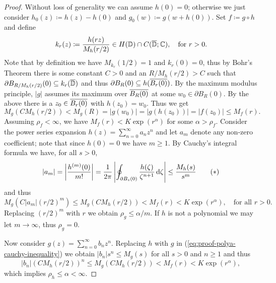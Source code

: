 \begin{proof}
    Without loss of generality we can assume $h(0) = 0$; otherwise we just consider $h_0(z) \coloneqq h(z) - h(0)$ and $g_0(w) \coloneqq g(w + h(0))$. Set $f \coloneqq g \circ h$ and define
    \begin{equation*}
        k_r(z) \coloneqq \frac{h(rz)}{M_h(r / 2)} \in H(\mathbb{D}) \cap C(\overline{\mathbb{D}}; \mathbb{C}), \quad \textrm{for } r > 0.
    \end{equation*}
    Note that by definition we have $M_{k_r}(1/2) = 1$ and $k_r(0) = 0$, thus by Bohr's Theorem there is some constant $C > 0$ and an $R / M_h(r/2) > C$ such that $\partial B_{R / M_h(r/2)}(0) \subseteq k_r(\overline{\mathbb{D}})$ and thus $\partial B_R(0) \subseteq h(\overline{B_r(0)})$. By the maximum modulus principle, $\vert g \vert$ assumes its maximum over $\overline{B_R(0)}$ at some $w_0 \in \partial B_R(0)$. By the above there is a $z_0 \in \overline{B_r(0)}$ with $h(z_0) = w_0$. Thus we get
    \begin{equation*}
        M_g(C M_h(r / 2)) < M_g(R) = \vert g(w_0) \vert = \vert g(h(z_0)) \vert = \vert f(z_0) \vert \leq M_f(r).
    \end{equation*}
    Assuming $\rho_f < \infty$, we have $M_f(r) < K \exp(r^\alpha)$ for some $\alpha > \rho_f$. Consider the power series expansion $h(z) = \sum_{n=0}^\infty a_n z^n$ and let $a_m$ denote any non-zero coefficient; note that since $h(0) = 0$ we have $m \geq 1$. By Cauchy's integral formula we have, for all $s > 0$,
    \begin{equation*} \label{eq:proof-polya-cauchy-inequality}
        \vert a_m \vert = \left\vert \frac{h^{(m)}(0)}{m!} \right\vert = \frac{1}{2\pi} \left\vert \oint_{\partial B_{s}(0)} \frac{h(\zeta)}{\zeta^{n+1}} \mathop{}\!\mathrm{d} \zeta \right\vert \leq \frac{M_h(s)}{s^m} \tag{\textasteriskcentered}
    \end{equation*}
    and thus
    \begin{equation*}
        M_g(C \vert a_m \vert (r/2)^m) \leq M_g(C M_h(r/2)) < M_f(r) < K \exp(r^\alpha), \quad \textrm{for all } r > 0.
    \end{equation*}
    Replacing $(r/2)^m$ with $r$ we obtain $\rho_g \leq \alpha / m $. If $h$ is not a polynomial we may let $m \to \infty$, thus $\rho_g = 0$.

    Now consider $g(z) = \sum_{n=0}^\infty b_n z^n$. Replacing $h$ with $g$ in (\ref{eq:proof-polya-cauchy-inequality}) we obtain $\vert b_n \vert s^n \leq M_g(s)$ for all $s > 0$ and $n \geq 1$ and thus
    \begin{equation*}
        \vert b_n \vert (C M_h(r/2))^n \leq M_g(C M_h(r/2)) < M_f(r) < K \exp(r^\alpha),
    \end{equation*}
    which implies $\rho_h \leq \alpha < \infty$.
\end{proof}

